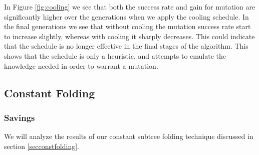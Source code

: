 In Figure \ref{fig:cooling} we see that both the success rate and gain for mutation are significantly higher over the generations when we apply the cooling schedule. In the final generations we see that without cooling the mutation success rate start to increase slightly, whereas with cooling it sharply decreases. This could indicate that the schedule is no longer effective in the final stages of the algorithm. This shows that the schedule is only a heuristic, and attempts to emulate the knowledge needed in order to warrant a mutation.


\subsection{Constant Folding}\label{subsecfoldingresults}
\subsubsection{Savings}
We will analyze the results of our constant subtree folding technique discussed in section \ref{secconstfolding}.

